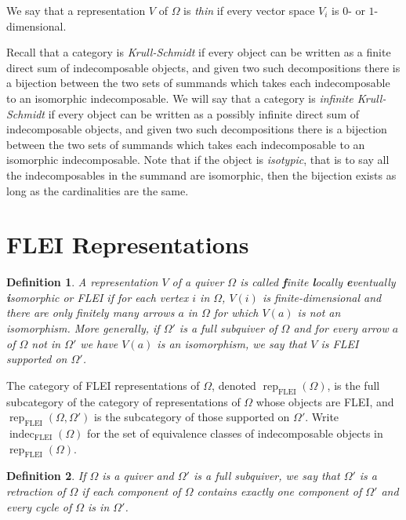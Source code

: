\documentclass{article}
\newtheorem{definition}{Definition}
\begin{document}
We say that a representation $V$ of $\Omega$ is \emph{thin} if every vector space $V_i$ is $0$- or $1$-dimensional.

Recall that a category is \emph{Krull-Schmidt} if every object can be written as a finite direct sum of indecomposable objects, and given two such decompositions there is a bijection between the two sets of summands which takes each indecomposable   to an isomorphic indecomposable. We will say that a category is \emph{infinite Krull-Schmidt} if every object can be written as a possibly  infinite direct sum of indecomposable objects, and given two such decompositions there is a bijection between the two sets of summands which takes each indecomposable   to an isomorphic indecomposable. Note that if the object is \emph{isotypic}, that is to say all the indecomposables in the summand are isomorphic, then the bijection exists as long as the cardinalities are the same.

\section{FLEI Representations} \label{sec: FLEI}
\begin{definition}
A representation $V$ of a quiver $\Omega$ is called \emph{\textbf{f}inite \textbf{l}ocally \textbf{e}ventually \textbf{i}somorphic} or \emph{FLEI} if for each vertex $i$ in $\Omega$, $V(i)$ is finite-dimensional and there are only finitely many arrows $a$ in $\Omega$ for which $V(a)$ is not an isomorphism. More generally, if $\Omega'$ is a full subquiver of $\Omega$ and for every arrow $a$ of $\Omega$ not in $\Omega'$ we have $V(a)$ is an isomorphism, we say that $V$ is \emph{FLEI supported on $\Omega'$.} 
\end{definition}

The category of FLEI representations of $\Omega$, denoted $\operatorname{rep}_{\text{FLEI}}(\Omega)$, is the full subcategory of the category of representations of $\Omega$ whose objects are FLEI, and $\operatorname{rep}_{\text{FLEI}}(\Omega,\Omega')$ is the subcategory of those supported on $\Omega'$. Write $\operatorname{indec}_{\text{FLEI}}(\Omega)$ for the set of equivalence classes of indecomposable objects in $\operatorname{rep}_{\text{FLEI}}(\Omega)$.
\begin{definition}
  If $\Omega$ is a quiver and $\Omega'$ is a full subquiver, we say that $\Omega'$ is a \emph{retraction} of $\Omega$ if each component of $\Omega$ contains exactly one component of $\Omega'$ and every  cycle  of $\Omega$ is in $\Omega'$.
\end{definition}
\end{document}
